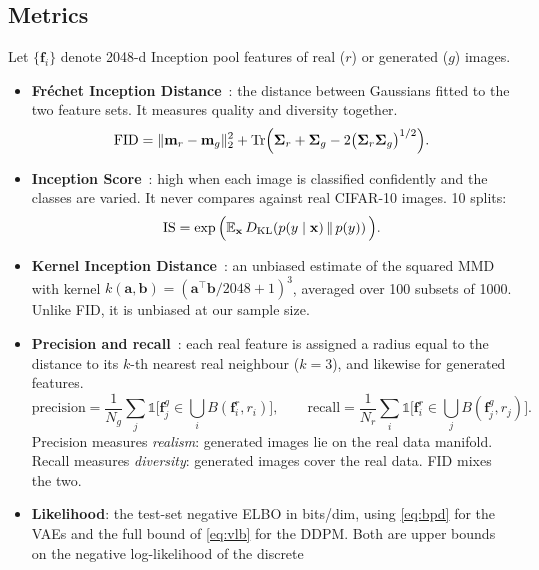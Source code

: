 \subsection{Metrics}
Let $\{\mathbf{f}_i\}$ denote 2048-d Inception pool features of real ($r$) or generated ($g$) images.
\begin{itemize}
  \item \textbf{Fréchet Inception Distance}~\citep{heusel2017fid}: the distance between Gaussians fitted to the
        two feature sets. It measures quality and diversity together.
  \begin{equation}
    \mathrm{FID} = \|\mathbf{m}_r-\mathbf{m}_g\|_2^2 + \operatorname{Tr}\!\Big(\bm{\Sigma}_r+\bm{\Sigma}_g-2\big(\bm{\Sigma}_r\bm{\Sigma}_g\big)^{1/2}\Big).
  \end{equation}
  \item \textbf{Inception Score}~\citep{salimans2016improved}: high when each image is classified confidently and
        the classes are varied. It never compares against real CIFAR-10 images. 10 splits:
  \begin{equation}
    \mathrm{IS} = \exp\Big(\mathbb{E}_{\mathbf{x}}\,D_{\mathrm{KL}}\!\left(p(y\mid\mathbf{x})\,\middle\|\,p(y)\right)\Big).
  \end{equation}
  \item \textbf{Kernel Inception Distance}~\citep{binkowski2018kid}: an unbiased estimate of the squared MMD with
        kernel $k(\mathbf{a},\mathbf{b})=(\mathbf{a}^\top\mathbf{b}/2048+1)^3$, averaged over 100 subsets of 1000.
        Unlike FID, it is unbiased at our sample size.
  \item \textbf{Precision and recall}~\citep{kynkaanniemi2019pr}: each real feature is assigned a radius equal to
        the distance to its $k$-th nearest real neighbour ($k=3$), and likewise for generated features.
  \begin{equation}
    \mathrm{precision} = \frac{1}{N_g}\sum_{j}\mathbb{1}\big[\mathbf{f}^g_j \in \textstyle\bigcup_i B(\mathbf{f}^r_i, r_i)\big],\qquad
    \mathrm{recall} = \frac{1}{N_r}\sum_{i}\mathbb{1}\big[\mathbf{f}^r_i \in \textstyle\bigcup_j B(\mathbf{f}^g_j, r_j)\big].
  \end{equation}
        Precision measures \emph{realism}: generated images lie on the real data manifold. Recall measures
        \emph{diversity}: generated images cover the real data. FID mixes the two.
  \item \textbf{Likelihood}: the test-set negative ELBO in bits/dim, using \cref{eq:bpd} for the VAEs and the full
        bound of \cref{eq:vlb} for the DDPM. Both are upper bounds on the negative log-likelihood of the discrete

\end{itemize}
